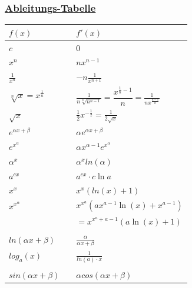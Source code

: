 \documentclass[6pt]{article}
\begin{document}
\begin{multicols*}{2}
\subsubsection*{\underline{Ableitungs-Tabelle}}
		\begin{onehalfspace}
			\begin{tabular}{ l | l l }
					$ f(x)$	\hspace{15mm}	& 	\hspace{1mm} &  $f'(x)$ 
					\\ \hline  %
					$c$													&&    	$0$																									\\
					$x^n$												&&		$nx^{n-1}$																						\\
					$\frac{1}{x^n}$									&&		$-n \frac{1}{x^{n+1}}$																		\\
					$\sqrt[n] x = x^{\frac{1}{n}}$			&&		$\frac{1}{n \sqrt[n]{n^{n-1}}} = \dfrac{x^{\frac{1}{n}-1}}{n} = 
																							\frac{1}{n {x}^{\frac{n-1}{n}}} $ 														\\
					$\sqrt {x}$										&&		$\frac{1}{2} x^{-\frac{1}{2}} =  \frac{1}{2 \sqrt{x}}$ 							\\
					$e^{\alpha x + \beta}$						&&		$\alpha e^{\alpha x + \beta}$ 															\\
					$e^{x^\alpha}$									&&		$\alpha x^{\alpha -1}  e^{x^\alpha}$ 												\\
					$\alpha^x$										&&		$\alpha^x ln(\alpha)$ 																		\\
					$ a^{cx} $  										&& 	    $ a^{cx} \cdot c \ln a $ 																	\\
					$x^x$												&&		$x^x (ln(x) + 1)$ 																				\\
					$x^{x^\alpha}$									&&		$x^{x^a}\left(ax^{a-1}\ln\left(x\right)+x^{a-1}\right) 	$					\\
																			&&		$= x^{x^a+a-1}\left(a\ln\left(x\right)+1\right)$ 							\\
																																																\\
					$ln(\alpha x + \beta)$						&&		$\frac{\alpha}{\alpha x + \beta}$ 													\\	
					$log_a(x)$										&& 		$\frac{1}{ln(a)\cdot x}$																		\\
																																																\\
					$sin(\alpha x + \beta)$					&&		$\alpha cos(\alpha x + \beta)$ 														\\

\end{tabular}
\end{onehalfspace}
\end{multicols*}
\end{document}

